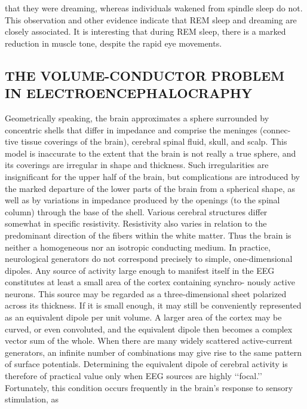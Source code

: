 that they were dreaming, whereas individuals wakened from spindle sleep do
not. This observation and other evidence indicate that REM sleep and
dreaming are closely associated. It is interesting that during REM sleep, there
is a marked reduction in muscle tone, despite the rapid eye movements.


\subsection{THE VOLUME-CONDUCTOR PROBLEM IN ELECTROENCEPHALOCRAPHY}

Geometrically speaking, the brain approximates a sphere surrounded by
concentric shells that differ in impedance and comprise the meninges (connec-
tive tissue coverings of the brain), cerebral spinal fluid, skull, and scalp. This
model is inaccurate to the extent that the brain is not really a true sphere, and
its coverings are irregular in shape and thickness. Such irregularities are
insignificant for the upper half of the brain, but complications are introduced
by the marked departure of the lower parts of the brain from a spherical shape,
as well as by variations in impedance produced by the openings (to the spinal
column) through the base of the shell. Various cerebral structures differ
somewhat in specific resistivity. Resistivity also varies in relation to the
predominant direction of the fibers within the white matter. Thus the brain
is neither a homogeneous nor an isotropic conducting medium.
In practice, neurological generators do not correspond precisely to simple,
one-dimensional dipoles. Any source of activity large enough to manifest itself
in the EEG constitutes at least a small area of the cortex containing synchro-
nously active neurons. This source may be regarded as a three-dimensional
sheet polarized across its thickness. If it is small enough, it may still be
conveniently represented as an equivalent dipole per unit volume. A larger
area of the cortex may be curved, or even convoluted, and the equivalent
dipole then becomes a complex vector sum of the whole. When there are many
widely scattered active-current generators, an infinite number of combinations
may give rise to the same pattern of surface potentials.
Determining the equivalent dipole of cerebral activity is therefore of
practical value only when EEG sources are highly ‘‘focal.’’ Fortunately, this
condition occurs frequently in the brain’s response to sensory stimulation, as
